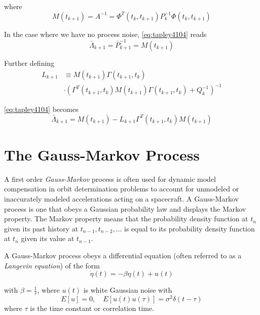 where
\begin{equation}
  \label{eq:tapley4105}
  M(t_{k+1}) = A^{-1} = \Phi ^T (t_k, t_{k+1} ) P^{-1}_k \Phi (t_k, t_{k+1} )
\end{equation}

In the case where we have no process noise, \ref{eq:tapley4104} reads
\begin{equation}
  \bar{\Lambda}_{k+1} = \bar{P}^{-1}_{k+1} = M(t_{k+1})
\end{equation}

Further defining
\begin{equation}
  \label{eq:tapley4106}
  \begin{split}
  L_{k+1} & \equiv M(t_{k+1}) \Gamma (t_{k+1}, t_k ) \\
          & \cdot \left( \Gamma ^T (t_{k+1}, t_k ) M(t_{k+1}) \Gamma (t_{k+1}, t_k ) + Q^{-1}_k \right) ^{-1}
  \end{split}
\end{equation}

\ref{eq:tapley4104} becomes
\begin{equation}
  \label{eq:tapley4107}
  \bar{\Lambda}_{k+1} =  M(t_{k+1}) - L_{k+1} \Gamma ^T (t_{k+1}, t_k ) M(t_{k+1})
\end{equation}

\section{The Gauss-Markov Process}
\label{sec:gauss-markov}
A first order \emph{Gauss-Markov} process is often used for dynamic model compensation 
in orbit determination problems to account for unmodeled or inaccurately
modeled accelerations acting on a spacecraft. A Gauss-Markov process is one that
obeys a Gaussian probability law and displays the Markov property. The Markov
property means that the probability density function at \(t_n\) given its past history at
\(t_{n-1} , t_{n-2} , \ldots \) is equal to its probability density function at 
\(t_n\) given its value at \(t_{n-1}\).

A Gauss-Markov process obeys a differential equation (often referred to as a 
\emph{Langevin equation}) of the form
\begin{equation}
  \label{eq:tapley4951}
  \dot{\eta} (t) = - \beta \eta (t) + u (t) 
\end{equation}

with \(\beta = \frac{1}{\tau}\), where \(u(t)\) is white Gaussian noise with
\begin{equation}
  \label{eq:tapley4952}
    E \left[ u \right] = 0, \quad E \left[ u(t) u(\tau ) \right] = \sigma ^2 \delta (t - \tau )
\end{equation}
 where \(\tau\) is the time constant or correlation time. 

